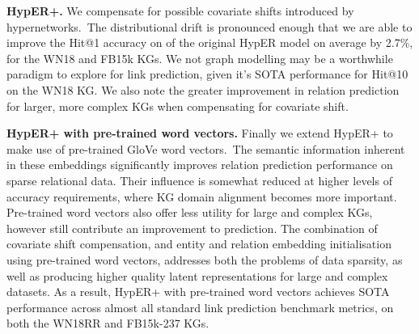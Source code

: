 \noindent \textbf{HypER+.} We compensate for possible covariate shifts introduced by hypernetworks.\ The distributional drift is pronounced enough that we are able to improve the Hit@1 accuracy on of the original HypER model on average by 2.7\%, for the WN18 and FB15k KGs. We not graph modelling may be a worthwhile paradigm to explore for link prediction, given it's SOTA performance for Hit@10 on the WN18 KG. We also note the greater improvement in relation prediction for larger, more complex KGs when compensating for covariate shift. \par

\noindent \textbf{HypER+ with pre-trained word vectors.} Finally we extend HypER+ to make use of pre-trained GloVe word vectors.\ The semantic information inherent in these embeddings significantly improves relation prediction performance on sparse relational data. Their influence is somewhat reduced at higher levels of accuracy requirements, where KG domain alignment becomes more important. Pre-trained word vectors also offer less utility for large and complex KGs, however still contribute an improvement to prediction. The combination of covariate shift compensation, and entity and relation embedding initialisation using pre-trained word vectors, addresses both the problems of data sparsity, as well as producing higher quality latent representations for large and complex datasets. As a result, HypER+ with pre-trained word vectors achieves SOTA performance across almost all standard link prediction benchmark metrics, on both the WN18RR and FB15k-237 KGs. 
